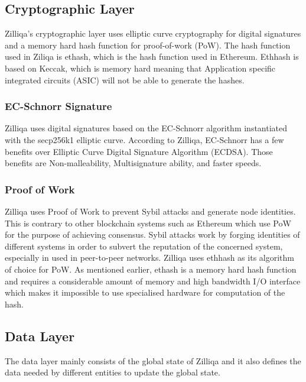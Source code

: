 \documentclass[a4paper,twoside,phd]{BYUPhys}
\begin{document}
\subsection{Cryptographic Layer}
Zilliqa's cryptographic layer uses elliptic curve cryptography for digital signatures and a memory hard hash function for proof-of-work (PoW)\cite{TheZilliqaTeam2017TheWhitepaper}. The hash function used in Ziliqa is ethash, which is the hash function used in Ethereum\cite{TheZilliqaTeam2017TheWhitepaper}. Ethhash is based on Keccak, which is memory hard meaning that Application specific integrated circuits (ASIC) will not be able to generate the hashes\cite{VitalikButerin2018quotVitalikEthereum}. 
\subsubsection{EC-Schnorr Signature}
Zilliqa uses digital signatures based on the EC-Schnorr algorithm instantiated with the secp256k1 elliptic curve\cite{TheZilliqaTeam2017TheWhitepaper}. According to Zilliqa, EC-Schnorr has a few benefits over Elliptic Curve Digital Signature Algorithm (ECDSA). Those benefits are Non-malleability, Multisignature ability, and faster speeds\cite{TheZilliqaTeam2017TheWhitepaper}. 

\subsubsection{Proof of Work}
Zilliqa uses Proof of Work to prevent Sybil attacks and generate node identities\cite{TheZilliqaTeam2017TheWhitepaper}. This is contrary to other blockchain systems such as Ethereum which use PoW for the purpose of achieving consensus\cite{TheZilliqaTeam2017TheWhitepaper}. Sybil attacks work by forging identities of different systems in order to subvert the reputation of the concerned system, especially in used in peer-to-peer networks\cite{Trifa2014SybilAttack}. Zilliqa uses ethhash as its algorithm of choice for PoW. As mentioned earlier, ethash is a memory hard hash function and requires a considerable amount of memory and high bandwidth I/O interface which makes it impossible to use specialised hardware for computation of the hash\cite{Wood2018ETHEREUM:LEDGER}.
\subsection{Data Layer}
The data layer mainly consists of the global state of Zilliqa and it also defines the data needed by different entities to update the global state\cite{TheZilliqaTeam2017TheWhitepaper}. 
\end{document}
